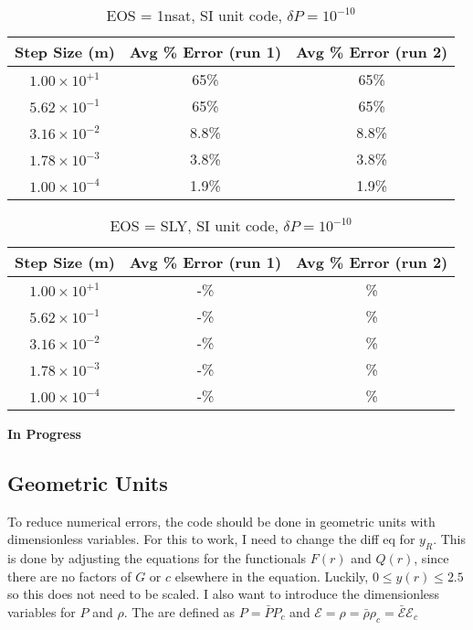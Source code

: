 \documentclass[11pt]{article}
\numberwithin{equation}{section}
\begin{document}
\begin{table}[h]
\caption{EOS = 1nsat, SI unit code,  $\delta P = 10^{-10}$ }
\centering
\begin{tabular}{|c | c| c|} \hline
Step Size (m) &  Avg \% Error (run 1) &  Avg \% Error (run 2) \\ \hline
$1.00  \times 10^{+1}$ & 65\% & 65\% \\
$5.62 \times 10^{-1}$  & 65\% & 65\% \\
$3.16 \times 10^{-2}$  & 8.8\% & 8.8\%\\
$1.78 \times 10^{-3}$  & 3.8\% & 3.8\% \\
$1.00 \times 10^{-4}$  & 1.9\%  & 1.9\%\\
\hline
\end{tabular}
\end{table}

\begin{table}[h]
\caption{EOS = SLY, SI unit code,  $\delta P = 10^{-10}$ }
\centering
\begin{tabular}{|c | c| c|} \hline
Step Size (m) &  Avg \% Error (run 1) &  Avg \% Error (run 2) \\ \hline
$1.00  \times 10^{+1}$ & -\% & \% \\
$5.62 \times 10^{-1}$  & -\% & \% \\
$3.16 \times 10^{-2}$  & -\% & \%\\
$1.78 \times 10^{-3}$  & -\% & \% \\
$1.00 \times 10^{-4}$  & -\%  & \%\\
\hline
\end{tabular}
\end{table}
 
\textbf{In Progress}
\clearpage

\subsection{Geometric Units} 

To reduce numerical errors, the code should be done in geometric units with dimensionless variables.  For this to work, I need to change the diff eq for $y_R$.  This is done by adjusting the equations for the functionals $F(r)$ and $Q(r)$, since there are no factors of $G$ or $c$ elsewhere in the equation.  Luckily, $0 \leq y(r) \leq 2.5$ so this does not need to be scaled.  
I also want to introduce the dimensionless variables for $P$ and $\rho$.  The are defined as $P = \bar{P} P_c$ and $\mathcal{E} = \rho = \bar{\rho} \rho_{c} = \bar{\mathcal{E}} \mathcal{E}_{c}$
\end{document}
